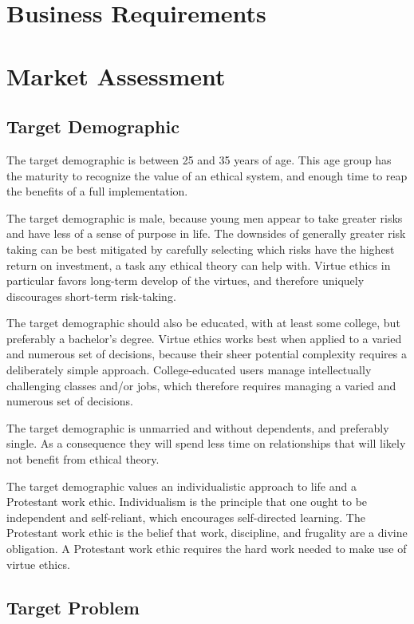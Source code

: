 \documentclass{article}
\begin{document}
\section{Business Requirements}

\section{Market Assessment}

\subsection{Target Demographic}

The target demographic is between 25 and 35 years of age.
This age group has the maturity to recognize the value of an ethical system, and enough time to reap the benefits of a full implementation.

The target demographic is male, because young men appear to take greater risks and have less of a sense of purpose in life.
The downsides of generally greater risk taking can be best mitigated by carefully selecting which risks have the highest return on investment, a task any ethical theory can help with.
Virtue ethics in particular favors long-term develop of the virtues, and therefore uniquely discourages short-term risk-taking.

The target demographic should also be educated, with at least some college, but preferably a bachelor's degree.
Virtue ethics works best when applied to a varied and numerous set of decisions, because their sheer potential complexity requires a deliberately simple approach.
College-educated users manage intellectually challenging classes and/or jobs, which therefore requires managing a varied and numerous set of decisions.

The target demographic is unmarried and without dependents, and preferably single.
As a consequence they will spend less time on relationships that will likely not benefit from ethical theory.

The target demographic values an individualistic approach to life and a Protestant work ethic.
Individualism is the principle that one ought to be independent and self-reliant, which encourages self-directed learning.
The Protestant work ethic is the belief that work, discipline, and frugality are a divine obligation.
A Protestant work ethic requires the hard work needed to make use of virtue ethics.

\subsection{Target Problem}
\end{document}
